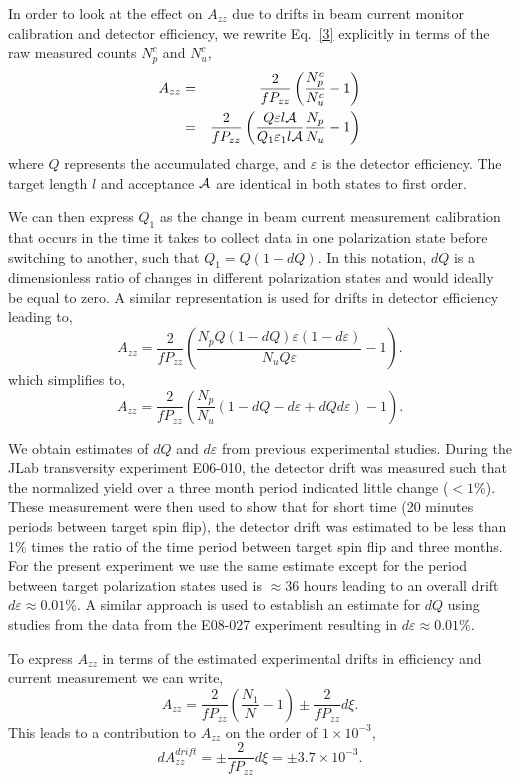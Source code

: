 In order to look at the effect on $A_{zz}$ due to drifts in beam current monitor calibration and detector efficiency, we rewrite Eq.~\ref{3} explicitly in terms of the raw measured counts $N_p^c$ and $N_u^c$,
\begin{eqnarray} \label{3c}
\nonumber
A_{zz}&=&\frac{2}{fP_{zz}}\left(\frac{N^c_p}{N^c_u}-1\right) \\
      &=&\frac{2}{fP_{zz}}\left(\frac{Q\varepsilon l \cal{A}}{Q_1\varepsilon_1 l \cal{A}}\frac{N_p}{N_u}-1\right)
\end{eqnarray}
where $Q$ represents the accumulated charge, and $\varepsilon$ is the detector efficiency. The target length $l$ and acceptance $\cal{A}$ are identical in both states to first order.

We can then express $Q_1$ as the change in beam current measurement calibration that occurs in
the time it takes to collect data in one polarization state before switching to another, such that $Q_1=Q(1-dQ)$.
In this notation, $dQ$ is a dimensionless ratio of changes in different polarization states and would ideally be equal to zero.  A similar representation
is used for drifts in detector efficiency leading to,
\begin{equation}
A_{zz}=\frac{2}{fP_{zz}}\left(\frac{N_pQ(1-dQ)\varepsilon(1-d\varepsilon)}{N_u Q\varepsilon}-1\right).
\end{equation}
which simplifies to,
\begin{equation}
A_{zz}=\frac{2}{fP_{zz}}\left(\frac{N_p}{N_u}(1-dQ-d\varepsilon+dQd\varepsilon)-1\right).
\end{equation}

We obtain estimates of $dQ$ and $d\varepsilon$ from previous experimental
studies.  During the JLab transversity experiment E06-010, the detector drift was measured such that the normalized yield over a three month period indicated little change ($<1$\%).
These measurement were then used to show that for short time (20 minutes periods between target spin flip),
the detector drift was estimated to be less than 1\% times the ratio of the time period between target spin flip and three months.
For the present experiment we use the same estimate except for the period between target polarization states used is
$\approx 36$ hours leading to an overall drift $d\varepsilon\approx 0.01\%$.  A similar approach is used to establish an estimate
for $dQ$ using studies from the data from the E08-027 experiment resulting in $d\varepsilon \approx 0.01\%$.

To express $A_{zz}$ in terms of the estimated experimental drifts in efficiency and current measurement we can write,
\begin{equation}
A_{zz}=\frac{2}{fP_{zz}}\left(\frac{N_1}{N}-1\right)\pm\frac{2}{fP_{zz}}d\xi.
\end{equation}
This leads to a contribution to $A_{zz}$ on the order of $1\times10^{-3}$,
\begin{equation}
dA_{zz}^{drift}=\pm\frac{2}{fP_{zz}}d\xi=\pm3.7\times10^{-3}.
\end{equation}

